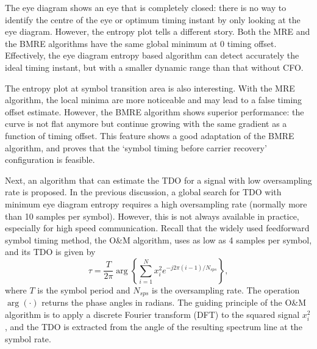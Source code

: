 \documentclass[journal,comsoc, onecolumn, 12pt,draftclsnofoot]{IEEEtran} %
\begin{document}
The eye diagram shows an eye that is completely closed: there is no way to identify the centre of the eye or optimum timing instant by only looking at the eye diagram.
However, the entropy plot tells a different story.
Both the MRE and the BMRE algorithms have the same global minimum at 0 timing offset. 
Effectively, the eye diagram entropy based algorithm can detect accurately the ideal timing instant,
but with a smaller dynamic range than that without CFO.

The entropy plot at symbol transition area is also interesting.
With the MRE algorithm, the local minima are more noticeable and may lead to a false timing offset estimate.
However, the BMRE algorithm shows superior performance:
the curve is not flat anymore but continue growing with the same gradient as a function of timing offset.
This feature shows a good adaptation of the BMRE algorithm, and proves that the `symbol timing before carrier recovery' configuration is feasible.


Next, an algorithm that can estimate the TDO for a signal with low oversampling rate is proposed.
In the previous discussion, a global search for TDO with minimum eye diagram entropy requires a high oversampling rate (normally more than 10 samples per symbol).
However, this is not always available in practice, especially for high speed communication.
Recall that the widely used feedforward symbol timing method, the O\&M algorithm, uses as low as 4 samples per symbol, and its TDO is given by
\begin{equation}
\tau=\frac{T}{2\pi}\arg \left\{ {\sum\limits_{i = 1}^{N} {x_i^2{e^{ - j2\pi (i-1)/N_{sps}}}} } \right\},
\label{eq:om}
\end{equation}
where \(T\) is the symbol period and \(N_{sps}\) is the oversampling rate.
The operation \(\arg( \cdot )\) returns the phase angles in radians.
The guiding principle of the O\&M algorithm is to apply a discrete Fourier transform (DFT) to the squared signal \(x_i^2\),
and the TDO is extracted from the angle of the resulting spectrum line at the symbol rate.
\end{document}
